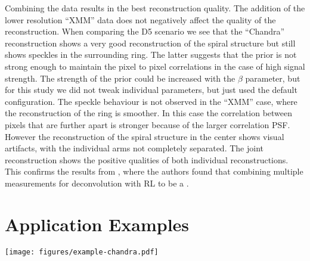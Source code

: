 \documentclass[twocolumn]{aastex631}
\newcommand{\chandra}{\textit{Chandra}~}
\newcommand{\jolideco}{\textit{Jolideco}~}
\begin{document}
    Combining the data results in the best reconstruction quality. The addition of the lower resolution \enquote{XMM} data does not negatively affect the quality of the reconstruction. When comparing the D5 scenario we see that the \enquote{Chandra} reconstruction shows a very good reconstruction of the spiral structure but still shows speckles in the surrounding ring. The latter suggests that the prior is not strong enough to maintain the pixel to pixel correlations in the case of high signal strength. The strength of the prior could be increased with the $\beta$ parameter, but for this study we did not tweak individual parameters, but just used the default configuration. The speckle behaviour is not observed in the \enquote{XMM} case, where the reconstruction of the ring is smoother. In this case the correlation between pixels that are further apart is stronger because of the larger correlation PSF. However the reconstruction of the spiral structure in the center shows visual artifacts, with the individual arms not completely separated. The joint reconstruction shows the positive qualities of both individual reconstructions. This confirms the results from \cite{Ingaramo2014}, where the authors found that combining multiple measurements for deconvolution with RL to be a .

    \section{Application Examples}
    \begin{figure*}
        \begin{centering}
            \texttt{[image: figures/example-chandra.pdf]}
            \caption{
               Result of the \jolideco method applied to \chandra data of the SNR \textit{1E~0102.2–7219}. The left large image shows the summed counts from 25 observations. The right large image  shows the result from the \jolideco deconvolution process. The flux is given as counts relative to the reference observation with ID=1308. The panels \textit{Zoom A}, \textit{Zoom B} and \textit{Zoom C} show a zoomed-in version of three example regions in the SNR, marked with the white rectangles in the large images. The colormap and scale used in the zoom insets is the same as used for the larger images.
            }
            \label{fig:example-chandra}
        \end{centering}
    \end{figure*}
\end{document}
